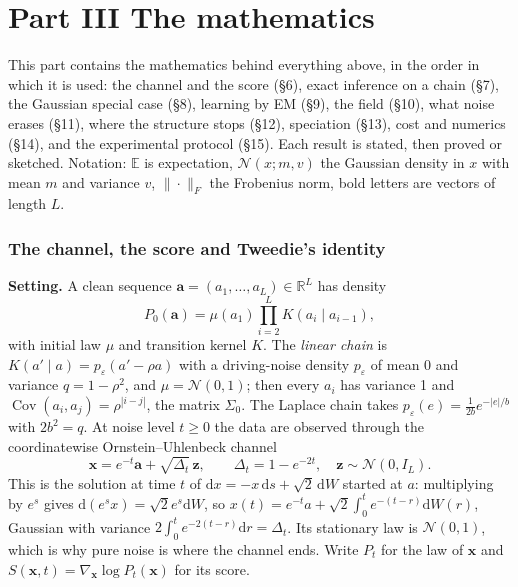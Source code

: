 \clearpage
\part*{Part III \quad The mathematics}

This part contains the mathematics behind everything above, in the order in which it is used: the channel and the score (\S6), exact
inference on a chain (\S7), the Gaussian special case (\S8), learning by EM (\S9), the field (\S10), what noise erases (\S11), where the
structure stops (\S12), speciation (\S13), cost and numerics (\S14), and the experimental protocol (\S15). Each result is stated, then
proved or sketched. Notation: $\mathbb E$ is expectation, $\mathcal N(x;m,v)$ the Gaussian density in $x$ with mean $m$ and variance $v$,
$\|\cdot\|_F$ the Frobenius norm, bold letters are vectors of length $L$.

\section{The channel, the score and Tweedie's identity}

\textbf{Setting.} A clean sequence $\mathbf a=(a_1,\dots,a_L)\in\mathbb R^L$ has density
\begin{equation}\label{eq:prior}
P_0(\mathbf a)=\mu(a_1)\prod_{i=2}^{L}K(a_i\mid a_{i-1}),
\end{equation}
with initial law $\mu$ and transition kernel $K$. The \emph{linear chain} is $K(a'\mid a)=p_\varepsilon(a'-\rho a)$ with a driving-noise density
$p_\varepsilon$ of mean 0 and variance $q=1-\rho^2$, and $\mu=\mathcal N(0,1)$; then every $a_i$ has variance 1 and $\operatorname{Cov}(a_i,a_j)=\rho^{|i-j|}$,
the matrix $\Sigma_0$. The Laplace chain takes $p_\varepsilon(e)=\tfrac1{2b}e^{-|e|/b}$ with $2b^2=q$. At noise level $t\ge0$ the data are observed through the
coordinatewise Ornstein--Uhlenbeck channel
\begin{equation}\label{eq:channel}
\mathbf x=e^{-t}\mathbf a+\sqrt{\Delta_t}\,\mathbf z,\qquad \Delta_t=1-e^{-2t},\quad \mathbf z\sim\mathcal N(0,I_L).
\end{equation}
This is the solution at time $t$ of $\mathrm dx=-x\,\mathrm ds+\sqrt2\,\mathrm dW$ started at $a$: multiplying by $e^{s}$ gives $\mathrm d(e^{s}x)=\sqrt2e^{s}\mathrm dW$, so
$x(t)=e^{-t}a+\sqrt2\int_0^te^{-(t-r)}\mathrm dW(r)$, Gaussian with variance $2\int_0^te^{-2(t-r)}\mathrm dr=\Delta_t$. Its stationary law is $\mathcal N(0,1)$, which is
why pure noise is where the channel ends. Write $P_t$ for the law of $\mathbf x$ and $S(\mathbf x,t)=\nabla_{\mathbf x}\log P_t(\mathbf x)$ for its score.

